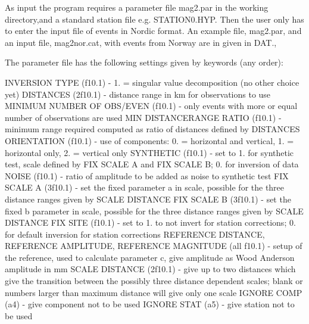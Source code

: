 As input the program requires a parameter file mag2.par in the 
working directory,and a standard station file e.g. STATION0.HYP. 
Then the user only has to enter the input file of events in Nordic 
format. An example file, mag2.par, and an input file, mag2nor.cat, 
with events from Norway are in given in DAT., 

The parameter file has the following settings given by keywords (any order):

INVERSION TYPE (f10.1) - 1. = singular value decomposition (no other choice yet)\newline
DISTANCES (2f10.1) - distance range in km for observations to use\newline
MINIMUM NUMBER OF OBS/EVEN (f10.1) - only events with more or equal number 
of observations are used\newline
MIN DISTANCERANGE RATIO (f10.1) - minimum range required computed as ratio 
of distances defined by DISTANCES\newline
ORIENTATION (f10.1) - use of components: 0. = horizontal and vertical, 
1. = horizontal only, 2. = vertical only\newline
SYNTHETIC (f10.1) - set to 1. for synthetic test, scale defined by FIX SCALE A and FIX SCALE B; 0. for inversion of data\newline
NOISE (f10.1) - ratio of amplitude to be added as noise to synthetic test\newline
FIX SCALE A (3f10.1) - set the fixed parameter a in scale, possible for the 
three distance ranges given by SCALE DISTANCE\newline
FIX SCALE B (3f10.1) - set the fixed b parameter in scale, possible for the 
three distance ranges given by SCALE DISTANCE\newline
FIX SITE (f10.1) - set to 1. to not invert for station corrections; 0. for 
default inversion for station corrections\newline
REFERENCE DISTANCE, REFERENCE AMPLITUDE, REFERENCE MAGNITUDE 
(all f10.1) - setup of the reference, used to calculate parameter c, 
give amplitude as Wood Anderson amplitude in mm\newline
SCALE DISTANCE (2f10.1) - give up to two distances which give the 
transition between the possibly three distance dependent scales; blank 
or numbers larger than maximum distance will give only one scale\newline
IGNORE COMP (a4)  - give component not to be used\newline
IGNORE STAT (a5) - give station not to be used\newline


